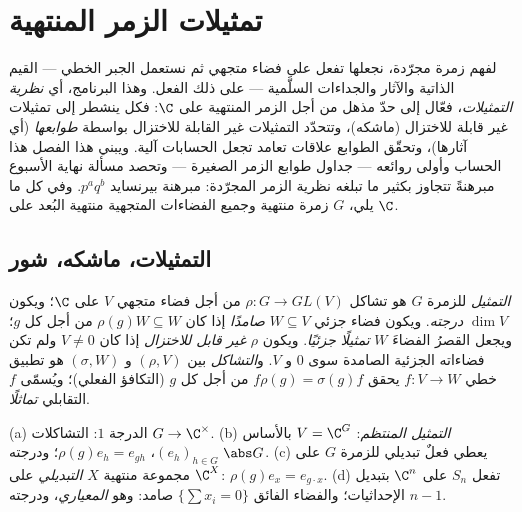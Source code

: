 \chapter{تمثيلات الزمر المنتهية}\label{ch:b3:representations}

لفهم زمرة مجرّدة، نجعلها تفعل على فضاء متجهي ثم نستعمل الجبر
الخطي --- القيم الذاتية والآثار والجداءات السلَّمية --- على ذلك
الفعل. وهذا البرنامج، أي \emph{نظرية التمثيلات}، فعّال إلى حدّ
مذهل من أجل الزمر المنتهية على $\C$: فكل  ينشطر إلى تمثيلات
غير قابلة للاختزال (ماشكه)، وتتحدّد التمثيلات غير القابلة
للاختزال بواسطة \emph{طوابعها} (أي آثارها)، وتحقّق الطوابع علاقات
تعامد تجعل الحسابات آلية. ويبني هذا الفصل هذا الحساب وأولى
روائعه --- جداول طوابع الزمر الصغيرة --- وتحصد مسألة نهاية
الأسبوع مبرهنةً تتجاوز بكثير ما تبلغه نظرية الزمر المجرّدة:
مبرهنة بيرنسايد $p^aq^b$. وفي كل ما يلي، $G$ زمرة منتهية وجميع
الفضاءات المتجهية منتهية البُعد على $\C$.

\section{التمثيلات، ماشكه، شور}

\begin{definition}\label{def:b3:representations:rep}
\emph{التمثيل} للزمرة $G$ هو تشاكل $\rho \colon G \to GL(V)$ من أجل فضاء
متجهي $V$ على $\C$؛ ويكون $\dim V$ \emph{درجته}. ويكون فضاء جزئي
$W \subseteq V$ \emph{صامدًا} إذا كان $\rho(g)W \subseteq W$ من أجل كل $g$؛ ويجعل
القصرُ الفضاءَ $W$ \emph{تمثيلًا جزئيًا}. ويكون $\rho$ \emph{غير
قابل للاختزال} إذا كان $V \neq
0$ ولم
تكن فضاءاته الجزئية الصامدة سوى $0$ و $V$. و\emph{التشاكل} بين
$(\rho, V)$ و $(\sigma, W)$ هو تطبيق خطي $f\colon V \to W$ يحقق $f\rho(g) = \sigma(g)f$ من أجل
كل $g$ (التكافؤ الفعلي)؛ ويُسمّى $f$ التقابلي \emph{تماثلًا}.
\end{definition}

\begin{example}\label{ex:b3:representations:examples}
(a) الدرجة $1$: التشاكلات $G \to \C^\times$.
(b) \emph{التمثيل المنتظم}: $V = \C^G$ بالأساس
$(e_h)_{h \in G}$، $\rho(g)e_h = e_{gh}$؛ ودرجته $\abs G$.
(c) يعطي فعلٌ تبديلي للزمرة $G$ على مجموعة منتهية $X$ \emph{
التبديلي} على $\C^X$: $\rho(g)e_x =
e_{g\cdot x}$.
(d) تفعل $S_n$ على $\C^n$ بتبديل الإحداثيات؛ والفضاء الفائق
$\{\sum x_i = 0\}$ صامد: وهو \emph{ المعياري}، ودرجته $n - 1$.
\end{example}

